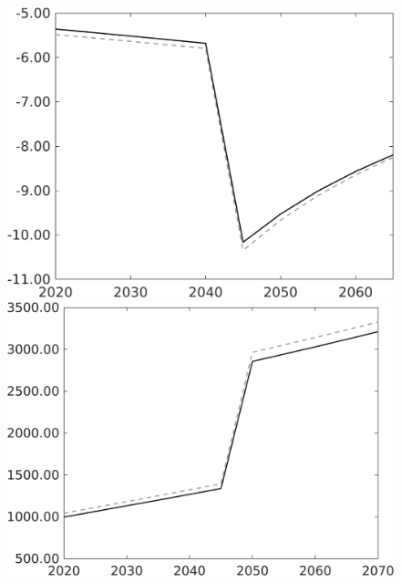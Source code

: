 \begin{figure}[h!!!]
\begin{minipage}[]{0.32\textwidth}
	\end{minipage}
\begin{minipage}[]{0.32\textwidth}
\includegraphics[width=1\textwidth]{../../codding_model/own_basedOnFried/optimalPol_010922_revision/figures/all_13Sept22_Tplus30/gAn_PercentageLFDynNT_noeff_Target_regime0_spillover0_knspil0_noskill0_sep0_xgrowth0_PV1_etaa0.79_lgd0.png}
\end{minipage}
	\begin{minipage}[]{0.32\textwidth}
		\includegraphics[width=1\textwidth]{../../codding_model/own_basedOnFried/optimalPol_010922_revision/figures/all_13Sept22_Tplus30/Tauf_OPT_COMPtaul_regime0_spillover0_knspil0_noskill0_sep0_xgrowth0_PV1_etaa0.79_lgd0.png}

\end{minipage}
\end{figure}
